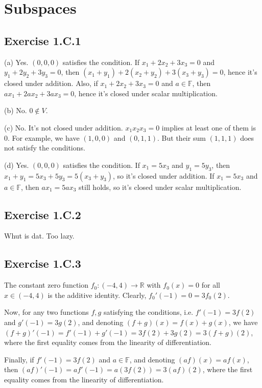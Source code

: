 \documentclass{book}
\begin{document}
\section{Subspaces}

\subsection*{Exercise 1.C.1}
(a)
Yes. $(0, 0, 0)$ satisfies the condition. If $x_1 + 2x_2 + 3x_3 = 0$ and $y_1 + 2y_2 + 3y_3 = 0$, then $(x_1 + y_1) + 2(x_2 + y_2) + 3(x_3 + y_3) = 0$, hence it's closed under addition. Also, if $x_1 + 2x_2 + 3x_3 = 0$ and $a \in \mathbb{F}$, then $ax_1 + 2ax_2 + 3ax_3 = 0$, hence it's closed under scalar multiplication.

\noindent
(b)
No. $0 \not \in V$.

\noindent
(c)
No. It's not closed under addition. $x_1 x_2 x_3 = 0$ implies at least one of them is $0$. For example, we have $(1, 0, 0)$ and $(0, 1, 1)$. But their sum $(1, 1, 1)$ does not satisfy the conditions.

\noindent
(d)
Yes. $(0, 0, 0)$ satisfies the condition. If $x_1 = 5x_3$ and $y_1 = 5y_3$, then $x_1 + y_1 = 5x_3 + 5y_3 = 5(x_3 + y_3)$, so it's closed under addition. If $x_1 = 5x_3$ and $a \in \mathbb{F}$, then $ax_1 = 5ax_3$ still holds, so it's closed under scalar multiplication.

\subsection*{Exercise 1.C.2}
Whut is dat. Too lazy.

\subsection*{Exercise 1.C.3}
The constant zero function $f_0: (-4, 4) \rightarrow \mathbb{R}$ with $f_0(x) = 0$ for all $x \in (-4, 4)$ is the additive identity. Clearly, $f_0'(-1) = 0 = 3 f_0(2)$.

Now, for any two functions $f, g$ satisfying the conditions, i.e. $f'(-1) = 3f(2)$ and $g'(-1) = 3g(2)$, and denoting $(f + g)(x) = f(x) + g(x)$, we have $(f + g)'(-1) = f'(-1) + g'(-1) = 3f(2) + 3g(2) = 3(f + g)(2)$, where the first equality comes from the linearity of differentiation.

Finally, if $f'(-1) = 3f(2)$ and $a \in \mathbb{F}$, and denoting $(af)(x) = a f(x)$, then $(af)'(-1) = a f'(-1) = a (3f(2)) = 3 (af)(2)$, where the first equality comes from the linearity of differentiation.
\end{document}
